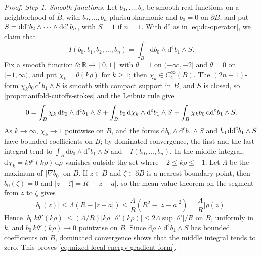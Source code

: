 \begin{proof}
\emph{Step 1. Smooth functions.}
Let $b_0,\ldots,b_n$ be smooth real functions on a neighborhood of $\overline B$, with $b_2,\ldots,b_n$ plurisubharmonic and $b_0=0$ on $\partial B$, and put $S=\mathrm{dd}^{\mathrm{c}} b_2\wedge\cdots\wedge\mathrm{dd}^{\mathrm{c}} b_n$, with $S=1$ if $n=1$. With $\mathrm d^{\mathrm c}$ as in \eqref{eq:dc-operator}, we claim that
\begin{equation}\label{eq:mixed-local-energy-gradient-form}
 I(b_0,b_1,b_2,\ldots,b_n)
          =\int_B\mathrm db_0\wedge\mathrm d^{\mathrm c}b_1\wedge S.
\end{equation}
Fix a smooth function $\theta\colon\mathbb R\to[0,1]$ with $\theta=1$ on $(-\infty,-2]$ and $\theta=0$ on $[-1,\infty)$, and put $\chi_k=\theta(k\rho)$ for $k\geq1$; then $\chi_k\in C^\infty_c(B)$. The $(2n-1)$-form $\chi_kb_0\,\mathrm d^{\mathrm c}b_1\wedge S$ is smooth with compact support in $B$, and $S$ is closed, so \cref{prop:manifold-cutoffs-stokes} and the Leibniz rule give
\[
 0=\int_B\chi_k\,\mathrm db_0\wedge\mathrm d^{\mathrm c}b_1\wedge S
   +\int_Bb_0\,\mathrm d\chi_k\wedge\mathrm d^{\mathrm c}b_1\wedge S
   +\int_B\chi_kb_0\,\mathrm{dd}^{\mathrm{c}} b_1\wedge S.
\]
As $k\to\infty$, $\chi_k\to1$ pointwise on $B$, and the forms $\mathrm db_0\wedge\mathrm d^{\mathrm c}b_1\wedge S$ and $b_0\,\mathrm{dd}^{\mathrm{c}} b_1\wedge S$ have bounded coefficients on $B$; by dominated convergence, the first and the last integral tend to $\int_B\mathrm db_0\wedge\mathrm d^{\mathrm c}b_1\wedge S$ and $-I(b_0,\ldots,b_n)$. In the middle integral, $\mathrm d\chi_k=k\theta'(k\rho)\,\mathrm d\rho$ vanishes outside the set where $-2\leq k\rho\leq-1$. Let $\Lambda$ be the maximum of $|\nabla b_0|$ on $\overline B$. If $z\in B$ and $\zeta\in\partial B$ is a nearest boundary point, then $b_0(\zeta)=0$ and $|z-\zeta|=R-|z-a|$, so the mean value theorem on the segment from $z$ to $\zeta$ gives
\[
 |b_0(z)|\leq\Lambda(R-|z-a|)\leq\frac{\Lambda}{R}(R^2-|z-a|^2)=\frac{\Lambda}{R}|\rho(z)|.
\]
Hence $|b_0\,k\theta'(k\rho)|\leq(\Lambda/R)|k\rho|\,|\theta'(k\rho)|\leq2\Lambda\sup|\theta'|/R$ on $B$, uniformly in $k$, and $b_0\,k\theta'(k\rho)\to0$ pointwise on $B$. Since $\mathrm d\rho\wedge\mathrm d^{\mathrm c}b_1\wedge S$ has bounded coefficients on $B$, dominated convergence shows that the middle integral tends to zero. This proves \eqref{eq:mixed-local-energy-gradient-form}.


\end{proof}
